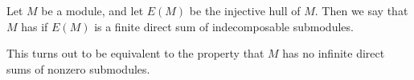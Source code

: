 \documentclass[12pt]{article}
\begin{document}
Let $M$ be a module, 
and let $E(M)$ be the injective hull of $M$.
Then we say that $M$ has {\it {}}
if $E(M)$ is a finite direct sum
of indecomposable submodules.

This turns out to be equivalent to the property
that $M$ has no infinite direct sums of nonzero submodules.
\end{document}
